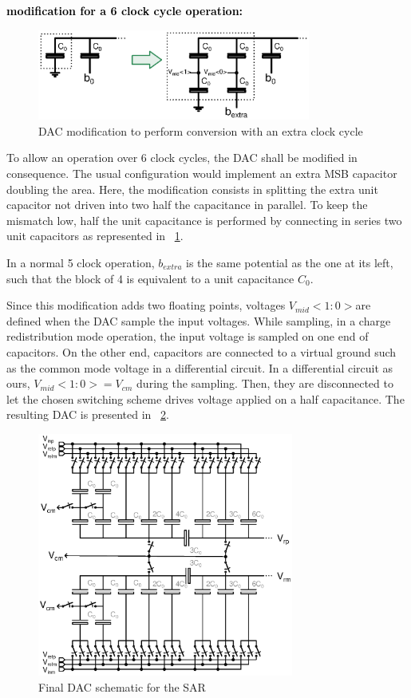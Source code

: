 \textbf{\textcolor{black}{modification for a 6 clock cycle operation:}}
\begin{figure}[htp]
	\centering
	\includegraphics[width=0.8\textwidth]{Chapter4/Figs/sar-extra-clock-cycle.ps}
	\caption{DAC modification to perform conversion with an extra clock cycle}
	\label{fig:sar-dac-extra}
\end{figure}
To allow an operation over 6 clock cycles, the DAC shall be modified in consequence. The usual configuration would implement an extra MSB capacitor doubling the area. Here, the modification consists in splitting the extra unit capacitor not driven into two half the capacitance in parallel. To keep the mismatch low, half the unit capacitance is performed by connecting in series two unit capacitors as represented in \figurename~\ref{fig:sar-dac-extra}.


In a normal 5 clock operation, \(b_{extra}\) is the same potential as the one at its left, such that the block of 4 is equivalent to a unit capacitance \(C_0 \).

Since this modification adds two floating points, voltages \(V_{mid}<1:0> \)are defined when the DAC sample the input voltages. While sampling, in a charge redistribution mode operation, the input voltage is sampled on one end of capacitors. On the other end, capacitors are connected to a virtual ground such as the common mode voltage in a differential circuit. In a differential circuit as ours, \(V_{mid}<1:0> = V_{cm}\) during the sampling. Then, they are disconnected to let the chosen switching scheme drives voltage applied on a half capacitance. The resulting DAC is presented in \figurename~\ref{fig:sar-dac-full}.

\begin{figure}[htp]
	\centering
	\includegraphics[width=0.75\textwidth]{Chapter4/Figs/sar-dac-full.ps}
	\caption{Final DAC schematic for the SAR}
	\label{fig:sar-dac-full}
\end{figure}

